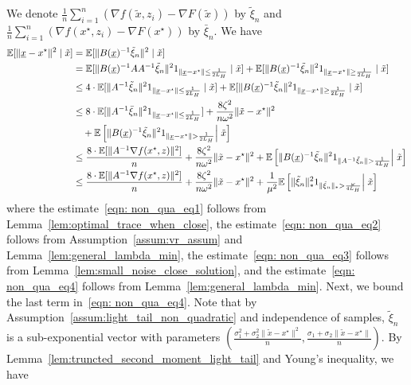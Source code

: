 \documentclass[11pt,twoside]{article}
\numberwithin{equation}{section}
\newcommand{\EE}{\mathbb{E}}
\newcommand{\1}{\mathbf{1}}
\theoremstyle{remark}
\theoremstyle{plain}
\newcommand{\liph}{L_H}
\newcommand{\lmin}{\omega}
\begin{document}
We denote $\frac{1}{n} \sum_{i=1}^{n} (\nabla f(\tilde x,z_i)  - \nabla F(\tilde x))$ by $\tilde \xi_n$ and $\frac{1}{n} \sum_{i=1}^{n} (\nabla f(x^\star,z_i)  - \nabla F(x^\star))$ by $\bar \xi_n$. We have
\begin{align}
\EE[\|\underline{x} - x^\star\|^2 \mid \tilde x] &= \EE[\|B(\underline{x})^{-1}\tilde \xi_n \|^2 \mid \tilde x ] \notag \\
&= \EE[\|B(\underline{x})^{-1} AA^{-1}\tilde \xi_n \|^21_{\|\underline{x} - x^\star\| \le  \frac{1}{2\liph}} \mid \tilde x ] +  \EE[\|B(\underline{x})^{-1}\tilde \xi_n \|^21_{\|\underline{x} - x^\star\|\ge \frac{1}{2\liph}} \mid \tilde x] \notag\\
& \le 4 \cdot \EE[\|  A^{-1}\tilde \xi_n \|^21_{\|\underline{x} - x^\star\| \le  \frac{1}{2\liph}} \mid \tilde x] +  \EE[\|B(\underline{x})^{-1}\tilde \xi_n \|^21_{\|\underline{x} - x^\star\|  \ge  \frac{1}{2\liph}} \mid \tilde x] \label{eqn: non_qua_eq1} \\
&\le 8\cdot \EE[\| A^{-1}\bar  \xi_n \| ^2 1_{\|\underline{x} - x^\star\| \le  \frac{1}{2\liph}}] + \frac{8 \zeta^2}{n  \lmin^2} \|\tilde x - x^\star\|^2 \notag \\
&\quad + \EE\left[\|B(\underline{x})^{-1} \tilde   \xi_n\|^2 1_{\|\underline{x} - x^\star\|  > \frac{1}{2\liph}}  \Big|\; \tilde x\right]   \label{eqn: non_qua_eq2}\\
& \le \frac{8 \cdot \EE[\|A^{-1} \nabla f(x^\star,z)\|^2]}{n} + \frac{8 \zeta^2}{n  \lmin^2}\|\tilde x - x^\star\| ^2  +  \EE\left[\|B(\underline{x})^{-1} \tilde   \xi_n\|^2 1_{\|A^{-1} \tilde  \xi_n\| > \frac{1}{4\liph}} \Big|\; \tilde x\right]\label{eqn: non_qua_eq3}\\
&\le  \frac{8\cdot \EE[\|A^{-1} \nabla f(x^\star,z)\|^2]}{n} + \frac{8\zeta^2}{n  \lmin^2}\|\tilde x - x^\star\|^2  +  \frac{1}{\mu^2}\EE\left[\|\tilde   \xi_n\|_*^2 1_{\|\tilde  \xi_n\|_* > \frac{\lmin}{4\liph}} \Big|\; \tilde x\right] \label{eqn: non_qua_eq4}
\end{align}
where the estimate~\eqref{eqn: non_qua_eq1} follows from Lemma~\ref{lem:optimal_trace_when_close}, the estimate~\eqref{eqn: non_qua_eq2} follows from Assumption~\ref{assum:vr_assum} and Lemma~\ref{lem:general_lambda_min},  the estimate~\eqref{eqn: non_qua_eq3} follows from  Lemma~\ref{lem:small_noise_close_solution}, and the estimate~\eqref{eqn: non_qua_eq4} follows from Lemma~\ref{lem:general_lambda_min}. Next, we bound the last term in~\eqref{eqn: non_qua_eq4}. Note that by Assumption~\ref{assum:light_tail_non_quadratic} and independence of samples, $ \tilde \xi_n$ is a sub-exponential vector with parameters $(\frac{\sigma_1^2 + \sigma_2^2\|\tilde x -x^\star\|^2}{n}, \frac{\sigma_1 + \sigma_2 \|\tilde x - x^\star\| }{n})$. By Lemma~\ref{lem:truncted_second_moment_light_tail} and Young's inequality, we have 
\end{document}
